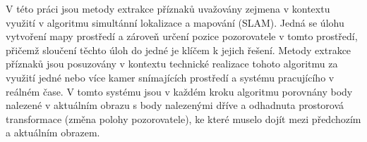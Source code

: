 V této práci jsou metody extrakce příznaků uvažovány zejmena v kontextu využití v algoritmu simultánní lokalizace a mapování (SLAM). Jedná se úlohu vytvoření mapy prostředí a zároveň určení pozice pozorovatele v tomto prostředí, přičemž sloučení těchto úloh do jedné je klíčem k jejich řešení. Metody extrakce příznaků jsou posuzovány v kontextu technické realizace tohoto algoritmu za využití jedné nebo více kamer snímajících prostředí a systému pracujícího v reálném čase. V tomto systému jsou v každém kroku algoritmu porovnány body nalezené v aktuálním obrazu s body nalezenými dříve a odhadnuta prostorová transformace (změna polohy pozorovatele), ke které muselo dojít mezi předchozím a aktuálním obrazem.

%
%
%
%
%
%
%
